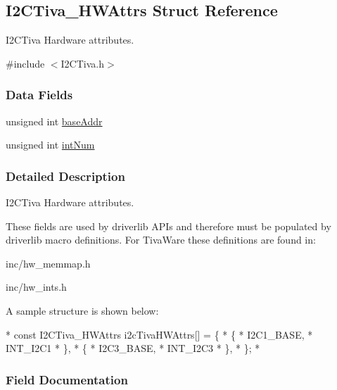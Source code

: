 \subsection{I2\-C\-Tiva\-\_\-\-H\-W\-Attrs Struct Reference}
\label{struct_i2_c_tiva___h_w_attrs}


I2\-C\-Tiva Hardware attributes.  




{\ttfamily \#include $<$I2\-C\-Tiva.\-h$>$}

\subsubsection*{Data Fields}
\begin{DoxyCompactItemize}
\item 
unsigned int \hyperlink{struct_i2_c_tiva___h_w_attrs_a12ab64360a0c09bbc1324d0935fcb63a}{base\-Addr}
\item 
unsigned int \hyperlink{struct_i2_c_tiva___h_w_attrs_adad44a5cf7a642e83e07b364e7623cb3}{int\-Num}
\end{DoxyCompactItemize}


\subsubsection{Detailed Description}
I2\-C\-Tiva Hardware attributes. 

These fields are used by driverlib A\-P\-Is and therefore must be populated by driverlib macro definitions. For Tiva\-Ware these definitions are found in\-:
\begin{DoxyItemize}
\item inc/hw\-\_\-memmap.\-h
\item inc/hw\-\_\-ints.\-h
\end{DoxyItemize}

A sample structure is shown below\-: 
\begin{DoxyCode}
*  \textcolor{keyword}{const} I2CTiva_HWAttrs i2cTivaHWAttrs[] = \{
*      \{
*          I2C1\_BASE,
*          INT\_I2C1
*      \},
*      \{
*          I2C3\_BASE,
*          INT\_I2C3
*      \},
*  \};
*  
\end{DoxyCode}
 

\subsubsection{Field Documentation}
